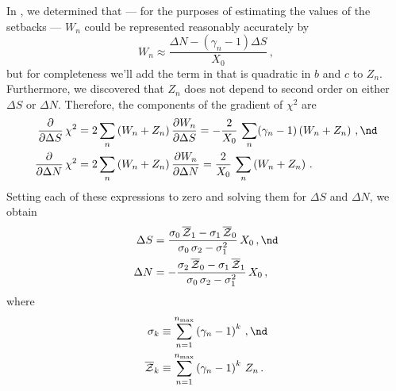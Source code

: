 In , we determined that --- for the purposes of estimating the values of the setbacks --- $W_n$ could be represented reasonably accurately by
\begin{equation} \label{eqn:w_n_approx}
  W_n \approx \frac{\Delta N - \left(\gamma_n - 1\right) \Delta S}{X_0}\, ,
\end{equation}
but for completeness we'll add the term in  that is quadratic in $b$ and $c$ to $Z_n$. Furthermore, we discovered that $Z_n$ does not depend to second order on either $\Delta S$ or $\Delta N$. Therefore, the components of the gradient of $\chi^2$ are
\begin{subequations} \label{chi2_grad}
  \begin{align}
    \frac{\partial}{\partial \Delta S}\, \chi^2 &= 2 \sum_n \left(W_n + Z_n\right)\frac{\partial W_n}{\partial \Delta S} = -\frac{2}{X_0}\, \sum_n (\gamma_n - 1) \left(W_n + Z_n\right)\, , \nd \\
    \frac{\partial}{\partial \Delta N}\, \chi^2 &= 2 \sum_n \left(W_n + Z_n\right)\frac{\partial W_n}{\partial \Delta N} = \frac{2}{X_0}\, \sum_n \left(W_n + Z_n\right)\, .
  \end{align}
\end{subequations}
Setting each of these expressions to zero and solving them for $\Delta S$ and $\Delta N$, we obtain
\begin{subequations} \label{eqn:rms_sol}
  \begin{align}
    \label{eqn:rms_sol_ds} \Delta S &= \frac{\sigma_0\, \overline{\mathcal{Z}}_1 - \sigma_1\, \overline{\mathcal{Z}}_0}{\sigma_0\, \sigma_2 - \sigma_1^2}\, X_0\, , \nd \\
    \label{eqn:rms_sol_dn} \Delta N &= -\frac{\sigma_2\, \overline{\mathcal{Z}}_0 - \sigma_1\, \overline{\mathcal{Z}}_1}{\sigma_0\, \sigma_2 - \sigma_1^2}\, X_0\, ,
  \end{align}
\end{subequations}
where
\begin{align}
  \sigma_k &\equiv \sum_{n = 1}^{n_\text{max}} \left(\gamma_n - 1\right)^k\, , \nd \\
  \overline{\mathcal{Z}}_k &\equiv \sum_{n = 1}^{n_\text{max}} \left(\gamma_n - 1\right)^k\, Z_n\, .
\end{align}

